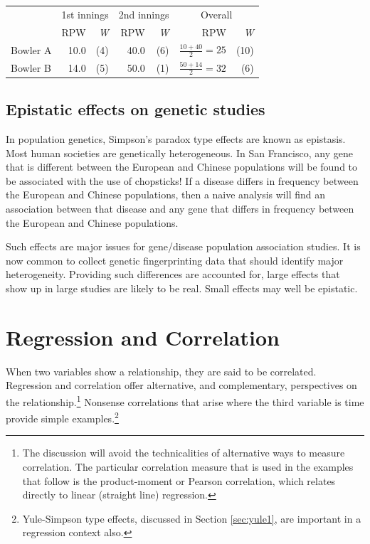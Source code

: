 \documentclass[
  10pt,
  b5paper]{book}
\begin{document}
\vspace*{-5pt}

\begin{center}
\begin{tabular}{lrr||rr||rr}
\hline
 & \multicolumn{2}{c}{1st innings} & \multicolumn{2}{c}{2nd innings} &
\multicolumn{2}{c}{Overall} \\
\cline{2-3} \cline{4-5} \cline{6-7}
         &  RPW & {\em W}   &  RPW & {\em W} &
           RPW & {\em W} \\[4pt]
Bowler A &  10.0 & (4) & 40.0 & (6)  &
$\frac{10+40}{2} = 25$ & (10)\\[4pt]
Bowler B & 14.0 & (5)  & 50.0 & (1) & $\frac{50+14}{2} = 32$  &  (6)\\[4pt]
\cline{2-3} \cline{4-5} \cline{6-7}
\end{tabular}
\end{center}

\hypertarget{epistatic-effects-on-genetic-studies}{%
\section{Epistatic effects on genetic studies}\label{epistatic-effects-on-genetic-studies}}

In population genetics, Simpson's paradox type effects are known as
epistasis. Most human societies are genetically heterogeneous. In
San Francisco, any gene that is different between the European and
Chinese populations will be found to be associated with the use of
chopsticks! If a disease differs in frequency between the European
and Chinese populations, then a naive analysis will find an
association between that disease and any gene that differs in
frequency between the European and Chinese populations.

Such effects are major issues for gene/disease population
association studies. It is now common to collect genetic
fingerprinting data that should identify major heterogeneity.
Providing such differences are accounted for, large effects that show
up in large studies are likely to be real. Small effects may well be
epistatic.

\hypertarget{sec:reg}{%
\chapter{Regression and Correlation}\label{sec:reg}}

When two variables show a relationship, they are said to be
correlated. Regression and correlation offer alternative,
and complementary, perspectives on the relationship.\footnote{The
  discussion will avoid the technicalities of alternative
  ways to measure correlation. The particular correlation
  measure that is used in the examples that follow is
  the product-moment or Pearson correlation, which relates
  directly to linear (straight line) regression.}
Nonsense correlations that arise where the third variable is
time provide simple examples.\footnote{Yule-Simpson type effects,
  discussed in Section \ref{sec:yule1}, are important in a
  regression context also.}
\end{document}
